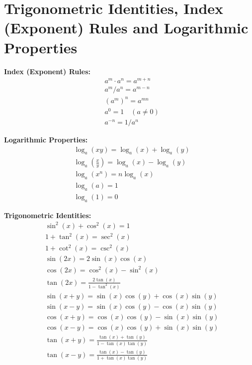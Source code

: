 \newpage
\section{Trigonometric Identities, Index (Exponent) Rules and Logarithmic Properties}
\begin{multicols}{2}
\noindent

\noindent
\textbf{Index (Exponent) Rules:}
\begin{align*}
&a^m \cdot a^n = a^{m+n} \\
&a^m / a^n = a^{m-n} \\
&(a^m)^n = a^{mn} \\
&a^0 = 1 \quad (a \neq 0) \\
&a^{-n} = 1/a^n
\end{align*}

\noindent
\textbf{Logarithmic Properties:}
\begin{align*}
&\log_a(xy) = \log_a(x) + \log_a(y) \\
&\log_a\left(\frac{x}{y}\right) = \log_a(x) - \log_a(y) \\
&\log_a(x^n) = n\log_a(x) \\
&\log_a(a) = 1 \\
&\log_a(1) = 0
\end{align*}


\textbf{Trigonometric Identities:}
\begin{align*}
&\sin^2(x) + \cos^2(x) = 1 \\
&1 + \tan^2(x) = \sec^2(x) \\
&1 + \cot^2(x) = \csc^2(x) \\
&\sin(2x) = 2\sin(x)\cos(x) \\
&\cos(2x) = \cos^2(x) - \sin^2(x) \\
&\tan(2x) = \frac{2\tan(x)}{1 - \tan^2(x)}\\
&\sin(x + y) = \sin(x)\cos(y) + \cos(x)\sin(y) \\
&\sin(x - y) = \sin(x)\cos(y) - \cos(x)\sin(y) \\
&\cos(x + y) = \cos(x)\cos(y) - \sin(x)\sin(y) \\
&\cos(x - y) = \cos(x)\cos(y) + \sin(x)\sin(y) \\
&\tan(x + y) = \frac{\tan(x) + \tan(y)}{1 - \tan(x)\tan(y)} \\
&\tan(x - y) = \frac{\tan(x) - \tan(y)}{1 + \tan(x)\tan(y)}
\end{align*}

\end{multicols}
